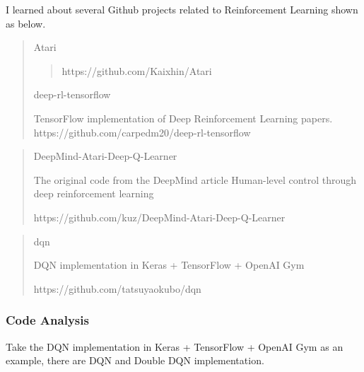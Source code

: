 \documentclass[10pt,twocolumn,letterpaper]{article}
\begin{document}
I learned about several Github projects related to Reinforcement Learning shown as below. 


\begin{quote}
\begin{center}
    Atari\\
    \begin{quote}
    https://github.com/Kaixhin/Atari
    \end{quote}
    deep-rl-tensorflow
    
\end{center}

   TensorFlow implementation of Deep Reinforcement Learning papers.\\
   https://github.com/carpedm20/deep-rl-tensorflow
   
\end{quote}


\begin{quote}
\begin{center}
     DeepMind-Atari-Deep-Q-Learner
\end{center}
   The original code from the DeepMind article Human-level control through deep reinforcement learning

   https://github.com/kuz/DeepMind-Atari-Deep-Q-Learner
\end{quote}

\begin{quote}
	\begin{center}
		dqn
	\end{center}
	DQN implementation in Keras + TensorFlow + OpenAI Gym 
	
	https://github.com/tatsuyaokubo/dqn
\end{quote}
\subsubsection{Code Analysis}
Take the DQN implementation in Keras + TensorFlow + OpenAI Gym as an example, there are DQN and Double DQN implementation.
\end{document}

